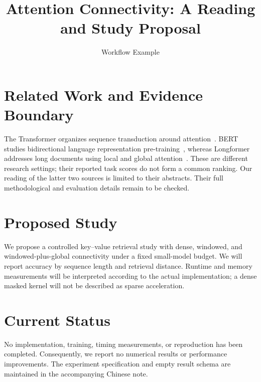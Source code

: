 \documentclass{article}
\title{Attention Connectivity: A Reading and Study Proposal}
\author{Workflow Example}
\date{}
\begin{document}
\maketitle

\section{Related Work and Evidence Boundary}
The Transformer organizes sequence transduction around attention~\cite{vaswani2017attention}.
BERT studies bidirectional language representation pre-training~\cite{devlin2018bert},
whereas Longformer addresses long documents using local and global attention~\cite{beltagy2020longformer}.
These are different research settings; their reported task scores do not form a common ranking.
Our reading of the latter two sources is limited to their abstracts.
Their full methodological and evaluation details remain to be checked.

\section{Proposed Study}
We propose a controlled key--value retrieval study with dense, windowed,
and windowed-plus-global connectivity under a fixed small-model budget.
We will report accuracy by sequence length and retrieval distance.
Runtime and memory measurements will be interpreted according to the actual
implementation; a dense masked kernel will not be described as sparse acceleration.

\section{Current Status}
No implementation, training, timing measurements, or reproduction has been completed.
Consequently, we report no numerical results or performance improvements.
The experiment specification and empty result schema are maintained in the accompanying Chinese note.



\end{document}
